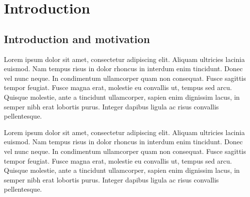 
\chapter{Introduction} %

\label{introduction} %


\section{Introduction and motivation}

Lorem ipsum dolor sit amet, consectetur adipiscing elit. Aliquam ultricies lacinia euismod. Nam tempus risus in dolor rhoncus in interdum enim tincidunt. Donec vel nunc neque. In condimentum ullamcorper quam non consequat. Fusce sagittis tempor feugiat. Fusce magna erat, molestie eu convallis ut, tempus sed arcu. Quisque molestie, ante a tincidunt ullamcorper, sapien enim dignissim lacus, in semper nibh erat lobortis purus. Integer dapibus ligula ac risus convallis pellentesque.

Lorem ipsum dolor sit amet, consectetur adipiscing elit. Aliquam ultricies lacinia euismod. Nam tempus risus in dolor rhoncus in interdum enim tincidunt. Donec vel nunc neque. In condimentum ullamcorper quam non consequat. Fusce sagittis tempor feugiat. Fusce magna erat, molestie eu convallis ut, tempus sed arcu. Quisque molestie, ante a tincidunt ullamcorper, sapien enim dignissim lacus, in semper nibh erat lobortis purus. Integer dapibus ligula ac risus convallis pellentesque.


